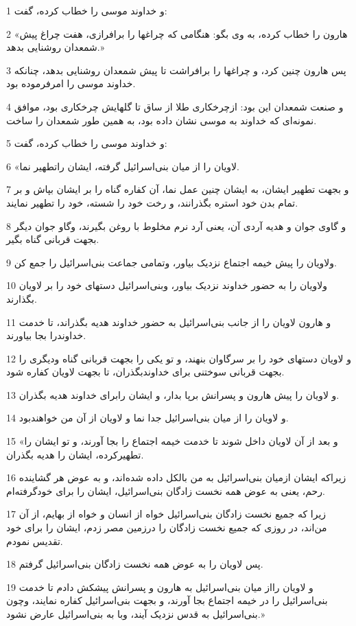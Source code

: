 \par 1 و خداوند موسی را خطاب کرده، گفت:
\par 2 «هارون را خطاب کرده، به وی بگو: هنگامی که چراغها را برافرازی، هفت چراغ پیش شمعدان روشنایی بدهد.»
\par 3 پس هارون چنین کرد، و چراغها را برافراشت تا پیش شمعدان روشنایی بدهد، چنانکه خداوند موسی را امرفرموده بود.
\par 4 و صنعت شمعدان این بود: ازچرخکاری طلا از ساق تا گلهایش چرخکاری بود، موافق نمونه‌ای که خداوند به موسی نشان داده بود، به همین طور شمعدان را ساخت.
\par 5 و خداوند موسی را خطاب کرده، گفت:
\par 6 «لاویان را از میان بنی‌اسرائیل گرفته، ایشان راتطهیر نما.
\par 7 و بجهت تطهیر ایشان، به ایشان چنین عمل نما، آن کفاره گناه را بر ایشان بپاش و بر تمام بدن خود استره بگذرانند، و رخت خود را شسته، خود را تطهیر نمایند.
\par 8 و گاوی جوان و هدیه آردی آن، یعنی آرد نرم مخلوط با روغن بگیرند، وگاو جوان دیگر بجهت قربانی گناه بگیر.
\par 9 ولاویان را پیش خیمه اجتماع نزدیک بیاور، وتمامی جماعت بنی‌اسرائیل را جمع کن.
\par 10 ولاویان را به حضور خداوند نزدیک بیاور، وبنی‌اسرائیل دستهای خود را بر لاویان بگذارند.
\par 11 و هارون لاویان را از جانب بنی‌اسرائیل به حضور خداوند هدیه بگذراند، تا خدمت خداوندرا بجا بیاورند.
\par 12 و لاویان دستهای خود را بر سرگاوان بنهند، و تو یکی را بجهت قربانی گناه ودیگری را بجهت قربانی سوختنی برای خداوندبگذران، تا بجهت لاویان کفاره شود.
\par 13 و لاویان را پیش هارون و پسرانش برپا بدار، و ایشان رابرای خداوند هدیه بگذران.
\par 14 و لاویان را از میان بنی‌اسرائیل جدا نما و لاویان از آن من خواهندبود.
\par 15 «و بعد از آن لاویان داخل شوند تا خدمت خیمه اجتماع را بجا آورند، و تو ایشان را تطهیرکرده، ایشان را هدیه بگذران.
\par 16 زیراکه ایشان ازمیان بنی‌اسرائیل به من بالکل داده شده‌اند، و به عوض هر گشاینده رحم، یعنی به عوض همه نخست زادگان بنی‌اسرائیل، ایشان را برای خودگرفته‌ام.
\par 17 زیرا که جمیع نخست زادگان بنی‌اسرائیل خواه از انسان و خواه از بهایم، از آن من‌اند، در روزی که جمیع نخست زادگان را درزمین مصر زدم، ایشان را برای خود تقدیس نمودم.
\par 18 پس لاویان را به عوض همه نخست زادگان بنی‌اسرائیل گرفتم.
\par 19 و لاویان رااز میان بنی‌اسرائیل به هارون و پسرانش پیشکش دادم تا خدمت بنی‌اسرائیل را در خیمه اجتماع بجا آورند، و بجهت بنی‌اسرائیل کفاره نمایند، وچون بنی‌اسرائیل به قدس نزدیک آیند، وبا به بنی‌اسرائیل عارض نشود.»
